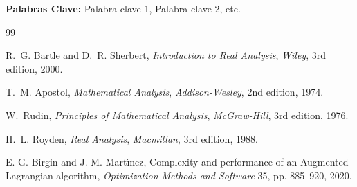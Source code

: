 \documentclass[11pt]{article}
\begin{document}
\noindent
\textbf{Palabras Clave:} Palabra clave 1, Palabra clave 2, etc.

\begin{thebibliography}{99}

R.~G. Bartle and D.~R. Sherbert, \emph{Introduction to Real Analysis}, \textit{Wiley}, 3rd edition, 2000.

T.~M. Apostol, \emph{Mathematical Analysis}, \textit{Addison-Wesley}, 2nd edition, 1974.

W.~Rudin, \emph{Principles of Mathematical Analysis}, \textit{McGraw-Hill}, 3rd edition, 1976.

H.~L. Royden, \emph{Real Analysis}, \textit{Macmillan}, 3rd edition, 1988.

 E. G. Birgin and J. M. Mart\'{\i}nez, Complexity and performance of an Augmented Lagrangian algorithm, \textit{Optimization Methods and Software} 35, pp. 885--920, 2020.

\end{thebibliography}
\end{document}
